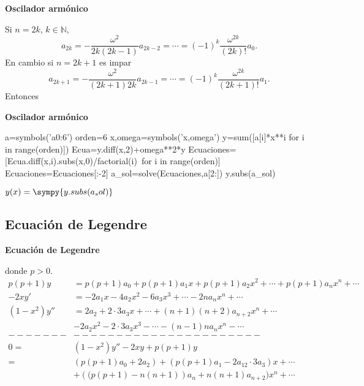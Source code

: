  \begin{frame}[fragile]{\textbf{Oscilador armónico}}
 
 Si $n=2k$, $k\in\mathbb{N}$,
\[a_{2k}=-\frac{\omega^2}{2k(2k-1)}a_{2k-2}=\cdots=(-1)^k\frac{\omega^{2k}}{(2k)!}a_0.\]
En cambio si $n=2k+1$ es impar
\[a_{2k+1}=-\frac{\omega^2}{(2k+1)2k}a_{2k-1}=\cdots=(-1)^k\frac{\omega^{2k}}{(2k+1)!}a_1.\]
Entonces
 \end{frame}




 \begin{frame}[fragile]{\textbf{Oscilador armónico}}

\begin{sympyblock}[][numbers=left,frame=single,framesep=5mm]
a=symbols('a0:6')
orden=6
x,omega=symbols('x,omega')
y=sum([a[i]*x**i for i in range(orden)])
Ecua=y.diff(x,2)+omega**2*y
Ecuaciones=[Ecua.diff(x,i).subs(x,0)/factorial(i)\
    for i in range(orden)]
Ecuaciones=Ecuaciones[:-2]
a_sol=solve(Ecuaciones,a[2:])
y.subs(a_sol)
\end{sympyblock}

\(y(x)=\sympy{y.subs(a_sol)  } \)

\end{frame}





\subsection{Ecuación de Legendre}
\begin{frame}[fragile]{\textbf{Ecuación de Legendre}}


donde $p>0$. 
{\small
\[\begin{split}
   p(p+1)y&= p(p+1)a_0+ p(p+1)a_1x+ p(p+1)a_2x^2+\cdots+ p(p+1)a_nx^n+\cdots\\
  -2xy'&=-2a_1x-4a_2x^2-6a_3x^3+\cdots-2na_{n}x^n+\cdots\\
(1-x^2)y''&= 2a_2+2\cdot 3a_3x+\cdots +(n+1)(n+2)a_{n+2}x^n+\cdots\\
          &-2a_2x^2-2\cdot 3a_3x^3-\cdots -(n-1)na_{n}x^n-\cdots\\
     -------&----------------------\\
0=&(1-x^2)y''-2xy+p(p+1)y\\
=& (p(p+1)a_0+2a_2)+(p(p+1)a_1-2a_12\cdot 3a_3)x+\cdots\\
     &+ \left( (p(p+1)-n(n+1)\right)a_n+n(n+1)a_{n+2})x^n+\cdots
  \end{split}
\]
}
\end{frame}



